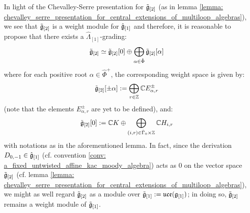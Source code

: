         \begin{remark}
            In light of the Chevalley-Serre presentation for $\tilde{\mathfrak{g}}_{[2]}$ (as in lemma \ref{lemma: chevalley_serre_presentation_for_central_extensions_of_multiloop_algebras}), we see that $\tilde{\mathfrak{g}}_{[2]}$ is a weight module for $\hat{\mathfrak{g}}_{[1]}$ and therefore, it is reasonable to propose that there exists a $\hat{\Lambda}_{[1]}$-grading:
                $$\tilde{\mathfrak{g}}_{[2]} \simeq \tilde{\mathfrak{g}}_{[2]}[0] \oplus \bigoplus_{\alpha \in \hat{\Phi}} \tilde{\mathfrak{g}}_{[2]}[\alpha]$$
            where for each positive root $\alpha \in \hat{\Phi}^+$, the corresponding weight space is given by:
                $$\tilde{\mathfrak{g}}_{[2]}[\pm \alpha] := \bigoplus_{r \in \mathbb{Z}} \mathbb{C} E_{\alpha, r}^{\pm}$$
            (note that the elements $E_{\alpha, r}^{\pm}$ are yet to be defined), and:
                $$\tilde{\g}_{[2]}[0] := \bbC K \oplus \bigoplus_{(i, r) \in \hat{\Gamma}_0 \x \Z} \bbC H_{i, r}$$
            with notations as in the aforementioned lemma. In fact, since the derivation $D_{0, -1} \in \hat{\mathfrak{g}}_{[1]}$ (cf. convention \ref{conv: a_fixed_untwisted_affine_kac_moody_algebra}) acts as $0$ on the vector space $\tilde{\mathfrak{g}}_{[2]}$ (cf. lemma \ref{lemma: chevalley_serre_presentation_for_central_extensions_of_multiloop_algebras}), we might as well regard $\tilde{\mathfrak{g}}_{[2]}$ as a module over $\tilde{\mathfrak{g}}_{[1]} := \mathfrak{uce}(\mathfrak{g}_{[1]})$; in doing so, $\tilde{\mathfrak{g}}_{[2]}$ remains a weight module of $\tilde{\mathfrak{g}}_{[1]}$. 
        \end{remark}
